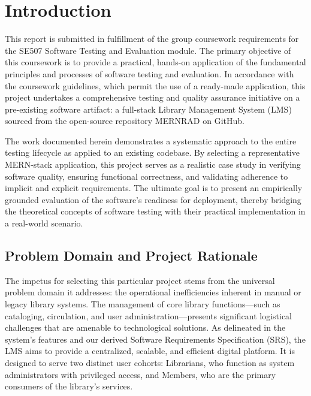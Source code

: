 \chapter{Introduction}
\label{chap:introduction}

This report is submitted in fulfillment of the group coursework requirements for the SE507 Software Testing and Evaluation module. The primary objective of this coursework is to provide a practical, hands-on application of the fundamental principles and processes of software testing and evaluation. In accordance with the coursework guidelines, which permit the use of a ready-made application, this project undertakes a comprehensive testing and quality assurance initiative on a pre-existing software artifact: a full-stack Library Management System (LMS) sourced from the open-source repository MERNRAD on GitHub.

The work documented herein demonstrates a systematic approach to the entire testing lifecycle as applied to an existing codebase. By selecting a representative MERN-stack application, this project serves as a realistic case study in verifying software quality, ensuring functional correctness, and validating adherence to implicit and explicit requirements. The ultimate goal is to present an empirically grounded evaluation of the software's readiness for deployment, thereby bridging the theoretical concepts of software testing with their practical implementation in a real-world scenario.

\section{Problem Domain and Project Rationale}
\label{sec:project_purpose}
The impetus for selecting this particular project stems from the universal problem domain it addresses: the operational inefficiencies inherent in manual or legacy library systems. The management of core library functions—such as cataloging, circulation, and user administration—presents significant logistical challenges that are amenable to technological solutions. As delineated in the system's features and our derived Software Requirements Specification (SRS), the LMS aims to provide a centralized, scalable, and efficient digital platform. It is designed to serve two distinct user cohorts: Librarians, who function as system administrators with privileged access, and Members, who are the primary consumers of the library's services.


